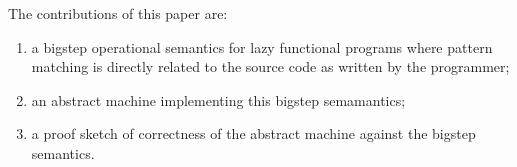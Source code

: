 The contributions of this paper are:
\begin{enumerate}
\item a bigstep operational semantics for lazy functional programs where pattern
  matching is directly related to the source code as written by
  the programmer;
\item an abstract machine implementing this bigstep semamantics;
\item a proof sketch of correctness of the abstract machine against
  the bigstep semantics.
\end{enumerate}




